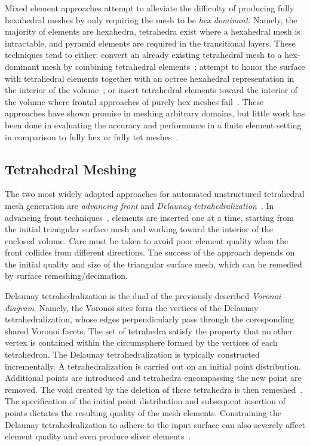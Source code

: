 Mixed element approaches attempt to alleviate the difficulty of producing fully hexahedral meshes by only requiring the mesh to be \textit{hex dominant}. Namely, the majority of elements are hexahedra, tetrahedra exist where a hexahedral mesh is intractable, and pyramid elements are required in the transitional layers. These techniques tend to either: convert an already existing tetrahedral mesh to a hex-dominant mesh by combining tetrahedral elements~\cite{baudouin_2014, gao_2017}; attempt to honor the surface with tetrahedral elements together with an octree hexahedral representation in the interior of the volume~\cite{young_2008, lobos_2015}; or insert tetrahedral elements toward the interior of the volume where frontal approaches of purely hex meshes fail~\cite{blacker_2001}. These approaches have shown promise in meshing arbitrary domains, but little work has been done in evaluating the accuracy and performance in a finite element setting in comparison to fully hex or fully tet meshes~\cite{tautges_2001}.

\subsection{Tetrahedral Meshing}
\label{Tetrahedral Meshing}

The two most widely adopted approaches for automated unstructured tetrahedral mesh generation are \textit{advancing front} and \textit{Delaunay tetrahedralization}~\cite{lohner_1997}. In advancing front techniques~\cite{jin_1993, lohner_1988}, elements are inserted one at a time, starting from the initial triangular surface mesh and working toward the interior of the enclosed volume. Care must be taken to avoid poor element quality when the front collides from different directions. The success of the approach depends on the initial quality and size of the triangular surface mesh, which can be remedied by surface remeshing/decimation.

Delaunay tetrahedralization is the dual of the previously described \textit{Voronoi diagram}. Namely, the Voronoi sites form the vertices of the Delaunay tetrahedralization, whose edges perpendicularly pass through the coresponding shared Voronoi facets. The set of tetrahedra satisfy the property that no other vertex is contained within the circumsphere formed by the vertices of each tetrahedron. The Delaunay tetrahedralization is typically constructed incrementally. A tetrahedralization is carried out on an initial point distribution. Additional points are introduced and tetrahedra encompassing the new point are removed. The void created by the deletion of these tetrahedra is then remeshed~\cite{young_2008}. The specification of the initial point distribution and subsequent insertion of points dictates the resulting quality of the mesh elements. Constraining the Delaunay tetrahedralization to adhere to the input surface can also severely affect element quality and even produce sliver elements~\cite{lohner_1997}.

